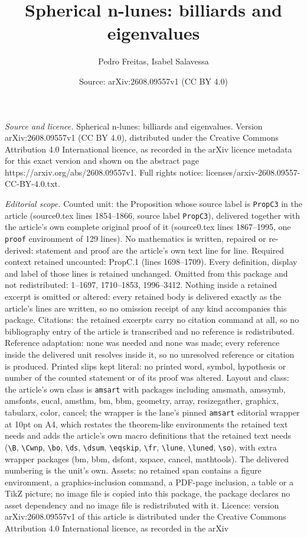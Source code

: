 \documentclass[10pt,a4paper]{amsart}
\title[Spherical n-lunes: billiards and eigenvalues]{Spherical n-lunes: billiards and eigenvalues}
\author{Pedro Freitas, Isabel Salavessa}
\date{Source: arXiv:2608.09557v1 (CC BY 4.0)}
\begin{document}
\maketitle

\noindent\emph{Source and licence.} Spherical n-lunes: billiards and eigenvalues. Version arXiv:2608.09557v1 (CC BY 4.0), distributed under the Creative Commons Attribution 4.0 International licence, as recorded in the arXiv licence metadata for this exact version and shown on the abstract page https://arxiv.org/abs/2608.09557v1. Full rights notice: licenses/arxiv-2608.09557-CC-BY-4.0.txt.\par\smallskip

\noindent\textit{Editorial scope.} Counted unit: the Proposition whose source label is \texttt{PropC3} in the article (source0.tex lines 1854--1866, source label \texttt{PropC3}), delivered together with the article's own complete original proof of it (source0.tex lines 1867--1995, one \texttt{proof} environment of 129 lines). No mathematics is written, repaired or re-derived: statement and proof are the article's own text line for line. Required context retained uncounted: PropC.1 (lines 1698--1709). Every definition, display and label of those lines is retained unchanged. Omitted from this package and not redistributed: 1--1697, 1710--1853, 1996--3412. Nothing inside a retained excerpt is omitted or altered: every retained body is delivered exactly as the article's lines are written, so no omission receipt of any kind accompanies this package. Citations: the retained excerpts carry no citation command at all, so no bibliography entry of the article is transcribed and no reference is redistributed. Reference adaptation: none was needed and none was made; every reference inside the delivered unit resolves inside it, so no unresolved reference or citation is produced. Printed slips kept literal: no printed word, symbol, hypothesis or number of the counted statement or of its proof was altered. Layout and class: the article's own class is \texttt{amsart} with packages including amsmath, amssymb, amsfonts, eucal, amsthm, bm, bbm, geometry, array, resizegather, graphicx, tabularx, color, cancel; the wrapper is the lane's pinned \texttt{amsart} editorial wrapper at 10pt on A4, which restates the theorem-like environments the retained text needs and adds the article's own macro definitions that the retained text needs (\texttt{\textbackslash B}, \texttt{\textbackslash Cwnp}, \texttt{\textbackslash bo}, \texttt{\textbackslash ds}, \texttt{\textbackslash dsum}, \texttt{\textbackslash eqskip}, \texttt{\textbackslash fr}, \texttt{\textbackslash lune}, \texttt{\textbackslash luned}, \texttt{\textbackslash so}), with extra wrapper packages (bm, bbm, dsfont, xspace, cancel, mathtools). The delivered numbering is the unit's own. Assets: no retained span contains a figure environment, a graphics-inclusion command, a PDF-page inclusion, a table or a TikZ picture; no image file is copied into this package, the package declares no asset dependency and no image file is redistributed with it. Licence: version arXiv:2608.09557v1 of this article is distributed under the Creative Commons Attribution 4.0 International licence, as recorded in the arXiv 
\end{document}
